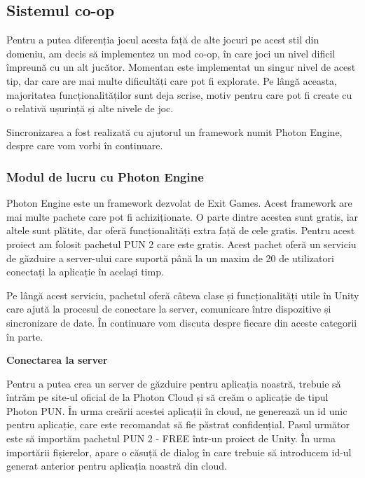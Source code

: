\documentclass[12pt, a4paper]{article}
\begin{document}
	
	\subsection{Sistemul co-op}
	\label{section: coop}
	
	Pentru a putea diferenția jocul acesta față de alte jocuri pe acest stil din domeniu, am decis să implementez un mod co-op, în care joci un nivel dificil împreună cu un alt jucător. Momentan este implementat un singur nivel de acest tip, dar care are mai multe dificultăți care pot fi explorate. Pe lângă aceasta, majoritatea funcționalităților sunt deja scrise, motiv pentru care pot fi create cu o relativă ușurință și alte nivele de joc.
	\newline
	
	Sincronizarea a fost realizată cu ajutorul un framework numit Photon Engine, despre care vom vorbi în continuare.
	
	
	
	
	
	\subsubsection{Modul de lucru cu Photon Engine}
	
	Photon Engine este un framework dezvolat de Exit Games. Acest framework are mai multe pachete care pot fi achiziționate. O parte dintre acestea sunt gratis, iar altele sunt plătite, dar oferă funcționalități extra față de cele gratis. Pentru acest proiect am folosit pachetul PUN 2 care este gratis. Acest pachet oferă un serviciu de găzduire a server-ului care suportă până la un maxim de 20 de utilizatori conectați la aplicație în același timp.
	\newline
	
	Pe lângă acest serviciu, pachetul oferă câteva clase și funcționalități utile în Unity care ajută la procesul de conectare la server, comunicare între dispozitive și sincronizare de date. În continuare vom discuta despre fiecare din aceste categorii în parte.
	\newline
	
	
	
	
	\newpage
	\textbf{Conectarea la server}
	\newline
	
	Pentru a putea crea un server de găzduire pentru aplicația noastră, trebuie să întrăm pe site-ul oficial de la Photon Cloud și să creăm o aplicație de tipul Photon PUN. În urma creării acestei aplicații în cloud, ne generează un id unic pentru aplicație, care este recomandat să fie păstrat confidențial. Pasul următor este să importăm pachetul PUN 2 - FREE într-un proiect de Unity. În urma importării fișierelor, apare o căsuță de dialog în care trebuie să introducem id-ul generat anterior pentru aplicația noastră din cloud.
	\newline
	
\end{document}
